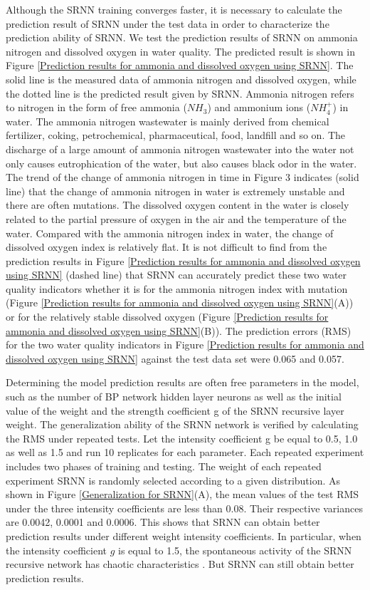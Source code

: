 \documentclass[runningheads]{llncs}
\begin{document}
Although the SRNN training converges faster, it is necessary to 
calculate the prediction result of SRNN under the test data in 
order to characterize the prediction ability of SRNN. 
We test the prediction results of SRNN on 
ammonia nitrogen and dissolved oxygen in water quality. 
The predicted result is shown in Figure \ref{Prediction results for ammonia and dissolved oxygen using SRNN}. The solid line 
is the measured data of ammonia nitrogen and dissolved oxygen, 
while the dotted line is the predicted result given by SRNN. 
Ammonia nitrogen refers to nitrogen in the form of free ammonia 
($NH_3$) and ammonium ions ($NH_4^+$) in water. The ammonia nitrogen 
wastewater is mainly derived from chemical fertilizer, coking, 
petrochemical, pharmaceutical, food, landfill and so on. 
The discharge of a large amount of ammonia nitrogen wastewater 
into the water not only causes eutrophication of the water, 
but also causes black odor in the water.
The trend of the change of ammonia nitrogen in time in Figure 3 
indicates (solid line) that the change of ammonia nitrogen in water 
is extremely unstable and there are often mutations. 
The dissolved oxygen content in the water is closely related to
the partial pressure of oxygen in the air and the 
temperature of the water. Compared with the ammonia nitrogen 
index in water, the change of dissolved oxygen index 
is relatively flat. It is not difficult to find from the prediction 
results in Figure \ref{Prediction results for ammonia and dissolved oxygen using SRNN} 
(dashed line) that SRNN can accurately predict 
these two water quality indicators whether it is for the 
ammonia nitrogen index with mutation (Figure \ref{Prediction results 
for ammonia and dissolved oxygen using SRNN}(A)) or 
for the relatively stable dissolved oxygen 
(Figure \ref{Prediction results for ammonia and dissolved oxygen using SRNN}(B)). 
The prediction errors (RMS) for the two water quality 
indicators in Figure \ref{Prediction results for ammonia and dissolved 
oxygen using SRNN} against the test data set were 0.065 and 0.057.

Determining the model prediction results are often free parameters in the model, 
such as the number of BP network hidden layer neurons as well as the initial
value of the weight and the strength coefficient g of the SRNN recursive 
layer weight. The generalization ability of the SRNN network is verified
by calculating the RMS under repeated tests. 
Let the intensity coefficient g be equal to 0.5, 1.0 as well as 1.5 and run 10 
replicates for each parameter. Each repeated experiment includes two
phases of training and testing. The weight of each repeated experiment 
SRNN is randomly selected according to a given distribution. 
As shown in Figure \ref{Generalization for SRNN}(A), the mean values of the test
RMS under the three intensity coefficients are less 
than 0.08. Their respective variances are 0.0042, 0.0001 and 0.0006. This 
shows that SRNN can obtain better prediction results under different weight
intensity coefficients. In particular, when the intensity coefficient
$g$ is equal to 1.5, the spontaneous activity of the SRNN recursive network has
chaotic characteristics \cite{RN17}. But SRNN can still obtain better prediction results.
\end{document}
